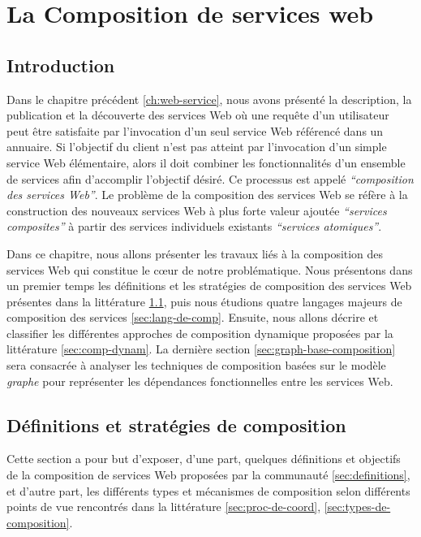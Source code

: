 \chapter{La Composition de services web}
\label{ch:composition}

\section*{Introduction}
 

Dans le chapitre précédent \ref{ch:web-service}, nous avons présenté
la description, la publication et la découverte des services Web où une
requête d'un utilisateur peut être satisfaite par l'invocation d'un
seul service Web référencé dans un annuaire. Si l'objectif du client
n'est pas atteint par l'invocation d'un simple service Web
élémentaire, alors il doit combiner les fonctionnalités d'un ensemble
de services afin d'accomplir l'objectif désiré. Ce processus est
appelé \textit{``composition des services Web''}. Le problème de la
composition des services Web se réfère à la construction des nouveaux
services Web à plus forte valeur ajoutée \textit{``services
  composites''} à partir des services individuels existants
\textit{``services atomiques''}.\bigskip

Dans ce chapitre, nous allons présenter les travaux liés à la
composition des services Web qui constitue le cœur de notre
problématique. Nous présentons dans un premier temps les définitions
et les stratégies de composition des services Web présentes dans la
littérature \ref{sec:defs}, puis nous étudions quatre langages majeurs
de composition des services \ref{sec:lang-de-comp}. Ensuite, nous
allons décrire et classifier les différentes approches de composition
dynamique proposées par la littérature \ref{sec:comp-dynam}. La dernière
section \ref{sec:graph-base-composition} sera
consacrée à analyser les techniques de composition basées sur le modèle
\textit{graphe} pour représenter les dépendances fonctionnelles entre
les services Web.

\newpage
\section{Définitions et stratégies de composition}
\label{sec:defs}
Cette section a pour but d'exposer, d'une part, quelques définitions
et objectifs de la composition de services Web proposées par la
communauté \ref{sec:definitions}, et d'autre part, les différents
types et mécanismes de composition selon différents points de vue
rencontrés dans la littérature \ref{sec:proc-de-coord},
\ref{sec:types-de-composition}.

